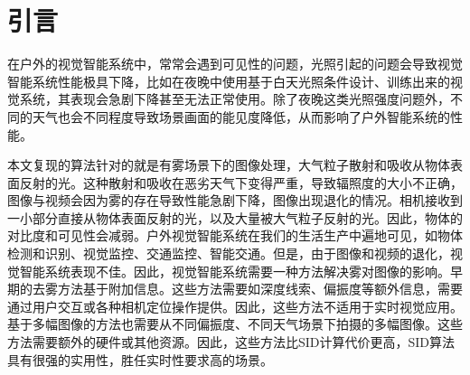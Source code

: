 \section{引言}
在户外的视觉智能系统中，常常会遇到可见性的问题，光照引起的问题会导致视觉智能系统性能极具下降，比如在夜晚中使用基于白天光照条件设计、训练出来的视觉系统，其表现会急剧下降甚至无法正常使用。除了夜晚这类光照强度问题外，不同的天气也会不同程度导致场景画面的能见度降低，从而影响了户外智能系统的性能。

本文复现的算法针对的就是有雾场景下的图像处理，大气粒子散射和吸收从物体表面反射的光。这种散射和吸收在恶劣天气下变得严重，导致辐照度的大小不正确，图像与视频会因为雾的存在导致性能急剧下降，图像出现退化的情况。相机接收到一小部分直接从物体表面反射的光，以及大量被大气粒子反射的光。因此，物体的对比度和可见性会减弱。户外视觉智能系统在我们的生活生产中遍地可见，如物体检测和识别、视觉监控、交通监控、智能交通。但是，由于图像和视频的退化，视觉智能系统表现不佳。因此，视觉智能系统需要一种方法解决雾对图像的影响。早期的去雾方法基于附加信息。这些方法需要如深度线索、偏振度等额外信息，需要通过用户交互或各种相机定位操作提供。因此，这些方法不适用于实时视觉应用。基于多幅图像的方法也需要从不同偏振度、不同天气场景下拍摄的多幅图像。这些方法需要额外的硬件或其他资源。因此，这些方法比SID计算代价更高，SID算法具有很强的实用性，胜任实时性要求高的场景。